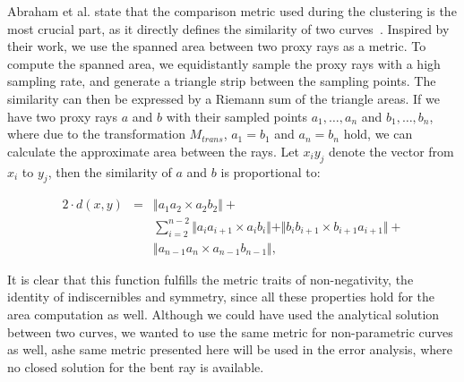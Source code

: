 \documentclass[journal]{vgtc}                %
\begin{document}
Abraham et al. state that the comparison metric used during the clustering is the most crucial part, as it directly defines the similarity of two curves~\cite{abraham03clustering}. Inspired by their work, we use the spanned area between two proxy rays as a metric. To compute the spanned area, we equidistantly sample the proxy rays with a high sampling rate, and generate a triangle strip between the sampling points. The similarity can then be expressed by a Riemann sum of the triangle areas. If we have two proxy rays $a$ and $b$ with their sampled points $a_1,\dots,a_n$ and $b_1,\dots,b_n$, where due to the transformation $M_{trans}$, $a_1=b_1$ and $a_n=b_n$ hold, we can calculate the approximate area between the rays. Let $x_iy_j$ denote the vector from $x_i$ to $y_j$, then the similarity of $a$ and $b$ is proportional to:

\begin{eqnarray*}
2\cdot d(x,y) &=& \Vert a_1a_2 \times a_2b_2\Vert + \\
&& \sum_{i=2}^{n-2}\Vert a_ia_{i+1} \times a_ib_i \Vert + \Vert b_ib_{i+1} \times b_{i+1}a_{i+1}\Vert + \\
&& \Vert a_{n-1}a_n \times a_{n-1}b_{n-1}\Vert,
\end{eqnarray*}

It is clear that this function fulfills the metric traits of non-negativity, the identity of indiscernibles and symmetry, since all these properties hold for the area computation as well. Although we could have used the analytical solution between two curves, we wanted to use the same metric for non-parametric curves as well, ashe same metric presented here will be used in the error analysis, where no closed solution for the bent ray is available.
\end{document}
